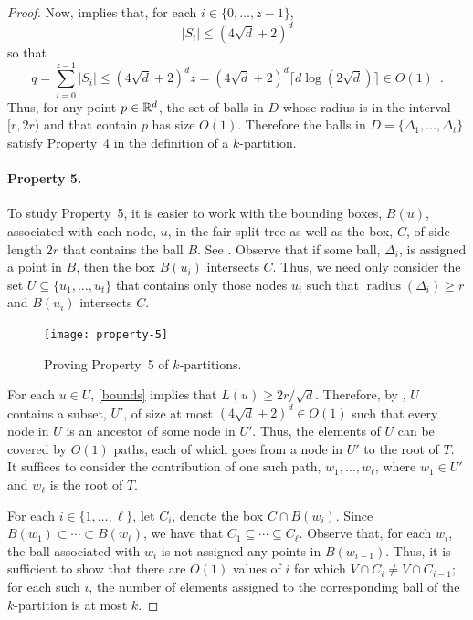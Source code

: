 \documentclass{patmorin}
\DeclareMathOperator{\radius}{radius}
\begin{document}
\begin{proof}
  Now,  implies that, for each $i\in\{0,\ldots,z-1\}$, 
  \[
     |S_i|\le (4\sqrt{d}+2)^d
  \]
  so that
  \[
     q = \sum_{i=0}^{z-1}|S_i|\le (4\sqrt{d}+2)^dz 
       = (4\sqrt{d}+2)^d\lceil d\log(2\sqrt{d})\rceil  
       \in O(1) \enspace .
  \]
  Thus, for any point $p\in\mathbb{R}^d$, the set of balls in $D$ whose radius
  is in the interval $[r,2r)$ and that contain $p$ has size $O(1)$.
  Therefore the balls in $D=\{\Delta_1,\ldots,\Delta_t\}$ satisfy
  Property~4 in the definition of a $k$-partition.

  \paragraph{Property 5.}
  To study Property~5, it is easier to work with the bounding boxes,
  $B(u)$, associated with each node, $u$, in the fair-split tree as
  well as the box, $C$, of side length $2r$ that contains the ball $B$.
  See .  Observe that if some ball, $\Delta_i$,
  is assigned a point in $B$, then the box $B(u_i)$ intersects $C$.
  Thus, we need only consider the set $U\subseteq\{u_1,\ldots,u_t\}$
  that contains only those nodes $u_i$ such that $\radius(\Delta_i)\ge r$
  and $B(u_i)$ intersects $C$.

  \begin{figure}
    \begin{center}
      \texttt{[image: property-5]}
    \end{center}
    \caption{Proving Property~5 of $k$-partitions.}
  \end{figure}

  For each $u\in U$, \eqref{bounds} implies that $L(u)\ge 2r/\sqrt{d}$.
  Therefore, by , $U$ contains a subset, $U'$, of
  size at most $(4\sqrt{d}+2)^d\in O(1)$ such that every node in $U$
  is an ancestor of some node in $U'$.  Thus, the elements of $U$ can be
  covered by $O(1)$ paths, each of which goes from a node in $U'$ to the 
  root of $T$.  It suffices to consider the contribution of one such
  path, $w_1,\ldots,w_\ell$, where $w_1\in U'$ and $w_\ell$ is the root
  of $T$.

  For each $i\in\{1,\ldots,\ell\}$, let $C_{i}$, denote the box $C\cap
  B(w_{i})$.  Since $B(w_1)\subset\cdots\subset B(w_\ell)$, we have that
  $C_1\subseteq\cdots\subseteq C_\ell$. Observe that, for each $w_i$, the
  ball associated with $w_i$ is not assigned any points in $B(w_{i-1})$.
  Thus, it is sufficient to show that there are $O(1)$ values of $i$
  for which $V\cap C_i\neq V\cap C_{i-1}$; for each such $i$, the number
  of elements assigned to the corresponding ball of the $k$-partition
  is at most $k$.


\end{proof}
\end{document}
